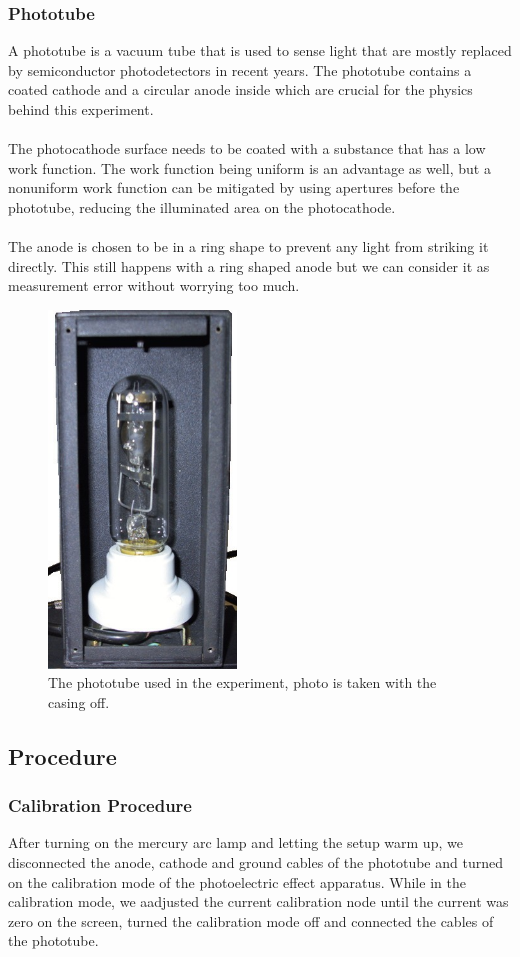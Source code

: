 		\subsubsection{Phototube}
			A phototube is a vacuum tube that is used to sense light that are mostly replaced by semiconductor photodetectors in recent years. The phototube contains a coated cathode and a circular anode inside which are crucial for the physics behind this experiment.
			\\
			\\
			The photocathode surface needs to be coated with a substance that has a low work function. The work function being uniform is an advantage as well, but a nonuniform work function can be mitigated by using apertures before the phototube, reducing the illuminated area on the photocathode.\\
			\\
			The anode is chosen to be in a ring shape to prevent any light from striking it directly. This still happens with a ring shaped anode but we can consider it as measurement error without worrying too much. 
			\begin{figure}[H]
				\centering
				\includegraphics[width=5cm]{images/phototube.jpeg}
				\caption{The phototube used in the experiment, photo is taken with the casing off.}
				\label{fig:phototube}
			\end{figure}
			
	
	\subsection{Procedure}
	
		\subsubsection{Calibration Procedure}
			After turning on the mercury arc lamp and letting the setup warm up, we disconnected the anode, cathode and ground cables of the phototube and turned on the calibration mode of the photoelectric effect apparatus. While in the calibration mode, we aadjusted the current calibration node until the current was zero on the screen, turned the calibration mode off and connected the cables of the phototube.
		
